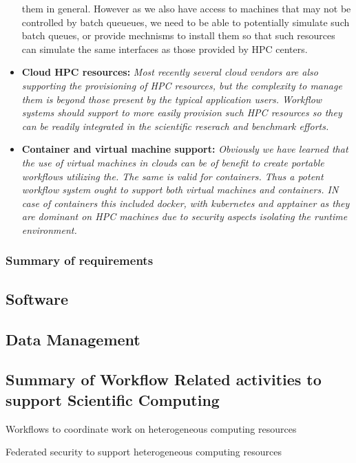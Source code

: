 \documentclass[utf8]{FrontiersinVancouver} %
\begin{document}
\begin{BOX}
\begin{itemize}
{    them in general. However as we also have access to machines that
    may not be controlled by batch queueues, we need to be able to
    potentially simulate such batch queues, or provide mechnisms to
    install them so that such resources can simulate the same
    interfaces as those provided by HPC centers.}
 \item {\bf Cloud HPC resources:} {\it Most recently several cloud
     vendors are also supporting the provisioning of HPC resources,
     but the complexity to manage them is beyond those present by the
     typical application users. Workflow systems should support to
     more easily provision such HPC resources so they can be readily
     integrated in the scientific reserach and benchmark efforts.}
 \item {\bf Container and virtual machine support:} {\it Obviously we
     have learned that the use of virtual machines in clouds can be of
     benefit to create portable workflows utilizing the. The same is
     valid for containers. Thus a potent workflow system ought to
     support both virtual machines and containers. IN case of
     containers this included docker, with kubernetes and apptainer as
     they are dominant on HPC machines due to security aspects
     isolating the runtime environment. }
  \end{itemize}
\end{BOX}

\subsubsection{Summary of requirements}



\subsection{Software}

\subsection{Data Management}


\subsection{Summary of Workflow Related activities to support Scientific Computing}

Workflows to coordinate work on heterogeneous computing resources

Federated security to support heterogeneous computing resources
\end{document}

